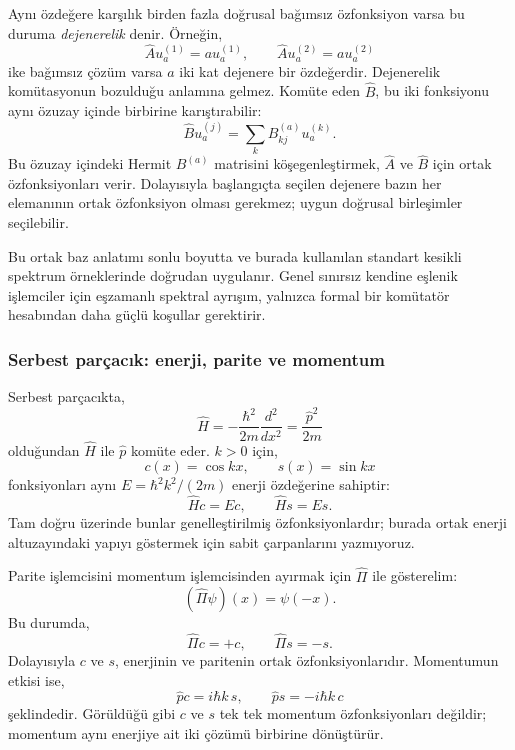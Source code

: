 Aynı özdeğere karşılık birden fazla doğrusal bağımsız özfonksiyon
varsa bu duruma \emph{dejenerelik} denir. Örneğin,
\begin{equation}
 \hat A u_a^{(1)}=a u_a^{(1)},\qquad
 \hat A u_a^{(2)}=a u_a^{(2)}
\end{equation}
ike bağımsız çözüm varsa $a$ iki kat dejenere bir özdeğerdir.
Dejenerelik komütasyonun bozulduğu anlamına gelmez. Komüte eden
$\hat B$, bu iki fonksiyonu aynı özuzay içinde birbirine
karıştırabilir:
\begin{equation}
 \hat B u_a^{(j)}=\sum_k B_{kj}^{(a)}u_a^{(k)}.
\end{equation}
Bu özuzay içindeki Hermit $B^{(a)}$ matrisini köşegenleştirmek,
$\hat A$ ve $\hat B$ için ortak özfonksiyonları verir. Dolayısıyla
başlangıçta seçilen dejenere bazın her elemanının ortak özfonksiyon
olması gerekmez; uygun doğrusal birleşimler seçilebilir.

Bu ortak baz anlatımı sonlu boyutta ve burada kullanılan standart
kesikli spektrum örneklerinde doğrudan uygulanır. Genel sınırsız
kendine eşlenik işlemciler için eşzamanlı spektral ayrışım, yalnızca
formal bir komütatör hesabından daha güçlü koşullar gerektirir.

\subsubsection{Serbest parçacık: enerji, parite ve momentum}

Serbest parçacıkta,
\begin{equation}
 \hat H=-\frac{\hbar^2}{2m}\frac{d^2}{dx^2}
       =\frac{\hat p^2}{2m}
\end{equation}
olduğundan $\hat H$ ile $\hat p$ komüte eder. $k>0$ için,
\begin{equation}
 c(x)=\cos kx,\qquad s(x)=\sin kx
\end{equation}
fonksiyonları aynı $E=\hbar^2k^2/(2m)$ enerji özdeğerine sahiptir:
\begin{equation}
 \hat Hc=Ec,\qquad \hat Hs=Es.
\end{equation}
Tam doğru üzerinde bunlar genelleştirilmiş özfonksiyonlardır;
burada ortak enerji altuzayındaki yapıyı göstermek için sabit
çarpanlarını yazmıyoruz.

Parite işlemcisini momentum işlemcisinden ayırmak için $\hat\Pi$
ile gösterelim:
\begin{equation}
 (\hat\Pi\psi)(x)=\psi(-x).
\end{equation}
Bu durumda,
\begin{equation}
 \hat\Pi c=+c,\qquad\hat\Pi s=-s.
\end{equation}
Dolayısıyla $c$ ve $s$, enerjinin ve paritenin ortak
özfonksiyonlarıdır. Momentumun etkisi ise,
\begin{equation}
 \hat p c=i\hbar k\,s,
 \qquad \hat p s=-i\hbar k\,c
 \label{eq:05_p_sin_cos}
\end{equation}
şeklindedir. Görüldüğü gibi $c$ ve $s$ tek tek momentum
özfonksiyonları değildir; momentum aynı enerjiye ait iki çözümü
birbirine dönüştürür.

